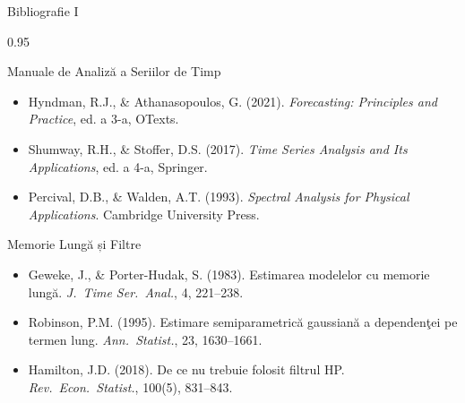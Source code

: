 \documentclass[9pt, aspectratio=169, t]{beamer}
\begin{document}
\begin{frame}{Bibliografie I}
    \begin{cminipage}{0.95\textwidth}
    \begin{block}{Manuale de Analiză a Seriilor de Timp}
        {\small
        \begin{itemize}\setlength{\itemsep}{0pt}
            \item Hyndman, R.J., \& Athanasopoulos, G. (2021). \textit{Forecasting: Principles and Practice}, ed. a 3-a, OTexts.
            \item Shumway, R.H., \& Stoffer, D.S. (2017). \textit{Time Series Analysis and Its Applications}, ed. a 4-a, Springer.
            \item Percival, D.B., \& Walden, A.T. (1993). \textit{Spectral Analysis for Physical Applications}. Cambridge University Press.
        \end{itemize}
        }
    \end{block}

    \begin{exampleblock}{Memorie Lungă și Filtre}
        {\small
        \begin{itemize}\setlength{\itemsep}{0pt}
            \item Geweke, J., \& Porter-Hudak, S. (1983). Estimarea modelelor cu memorie lungă. \textit{J.\ Time Ser.\ Anal.}, 4, 221--238.
            \item Robinson, P.M. (1995). Estimare semiparametrică gaussiană a dependenţei pe termen lung. \textit{Ann.\ Statist.}, 23, 1630--1661.
            \item Hamilton, J.D. (2018). De ce nu trebuie folosit filtrul HP. \textit{Rev.\ Econ.\ Statist.}, 100(5), 831--843.
        \end{itemize}
        }
    \end{exampleblock}
    \end{cminipage}
\end{frame}
\end{document}
